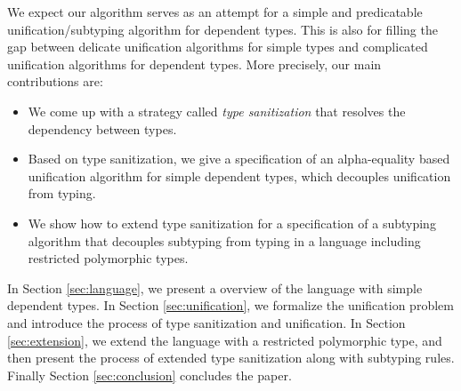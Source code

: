 We expect our algorithm serves as an attempt
for a simple and predicatable unification/subtyping algorithm for dependent
types. This is also for
filling the gap between
delicate unification algorithms for simple types
and
complicated unification algorithms for dependent types.
More precisely, our main contributions are:

\begin{itemize}
  \item We come up with a strategy called \textit{type sanitization}
    that resolves the
    dependency between types.
  \item Based on type sanitization, we give a specification of an alpha-equality
    based unification algorithm
    for simple dependent types, which
    decouples unification from typing.
  \item We show how to extend type sanitization for a specification of a
    subtyping algorithm
    that decouples
    subtyping from typing in a language including restricted polymorphic types.
\end{itemize}

In Section \ref{sec:language}, we present a overview of the language with simple
dependent types. In Section \ref{sec:unification}, we formalize the unification
problem and introduce the process of type sanitization and unification. In
Section \ref{sec:extension}, we extend the language with a restricted
polymorphic type, and then present the process of extended type sanitization
along with subtyping rules. Finally Section \ref{sec:conclusion} concludes the
paper.